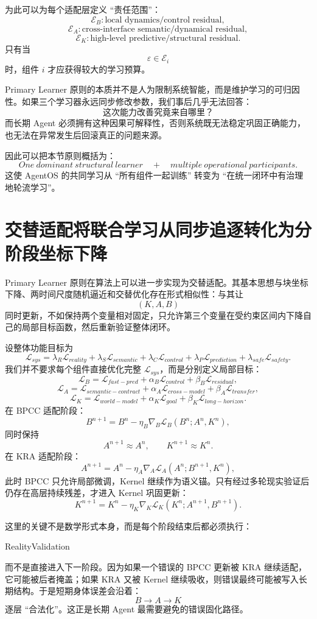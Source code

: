 为此可以为每个适配层定义 ``责任范围''：
\[
\mathcal{E}_B:
\text{local dynamics/control residual},
\]
\[
\mathcal{E}_A:
\text{cross-interface semantic/dynamical residual},
\]
\[
\mathcal{E}_K:
\text{high-level predictive/structural residual}.
\]
只有当
\[
\varepsilon\in\mathcal E_i
\]
时，组件 $i$ 才应获得较大的学习预算。

Primary Learner 原则的本质并不是人为限制系统智能，而是维护学习的可归因性。如果三个学习器永远同步修改参数，我们事后几乎无法回答：
\[
\text{这次能力改善究竟来自哪里？}
\]
而长期 Agent 必须拥有这种因果可解释性，否则系统既无法稳定巩固正确能力，也无法在异常发生后回滚真正的问题来源。

因此可以把本节原则概括为：
\[
\boxed{
One\ dominant\ structural\ learner
\quad
+\quad
multiple\ operational\ participants.
}
\]
这使 AgentOS 的共同学习从 ``所有组件一起训练'' 转变为 ``在统一闭环中有治理地轮流学习''。

\section{交替适配将联合学习从同步追逐转化为分阶段坐标下降}

Primary Learner 原则在算法上可以进一步实现为交替适配。其基本思想与块坐标下降、两时间尺度随机逼近和交替优化存在形式相似性：与其让
\[
(K,A,B)
\]
同时更新，不如保持两个变量相对固定，只允许第三个变量在受约束区间内下降自己的局部目标函数，然后重新验证整体闭环。

设整体功能目标为
\[
\mathcal L_{sys}
=
\lambda_R\mathcal L_{reality}
+
\lambda_S\mathcal L_{semantic}
+
\lambda_C\mathcal L_{control}
+
\lambda_P\mathcal L_{prediction}
+
\lambda_{safe}\mathcal L_{safety}.
\]
我们并不要求每个组件直接优化完整 $\mathcal L_{sys}$，而是分别定义局部目标：
\[
\mathcal L_B
=
\mathcal L_{fast-pred}
+
\alpha_B\mathcal L_{control}
+
\beta_B\mathcal L_{residual},
\]
\[
\mathcal L_A
=
\mathcal L_{semantic-contract}
+
\alpha_A\mathcal L_{cross-model}
+
\beta_A\mathcal L_{transfer},
\]
\[
\mathcal L_K
=
\mathcal L_{world-model}
+
\alpha_K\mathcal L_{goal}
+
\beta_K\mathcal L_{long-horizon}.
\]
在 BPCC 适配阶段：
\[
B^{n+1}
=
B^n
-
\eta_B
\nabla_B
\mathcal L_B
(B^n;A^n,K^n),
\]
同时保持
\[
A^{n+1}\approx A^n,
\qquad
K^{n+1}\approx K^n.
\]
在 KRA 适配阶段：
\[
A^{n+1}
=
A^n
-
\eta_A
\nabla_A
\mathcal L_A
(A^n;B^{n+1},K^n),
\]
此时 BPCC 只允许局部微调，Kernel 继续作为语义锚。只有经过多轮现实验证后仍存在高层持续残差，才进入 Kernel 巩固更新：
\[
K^{n+1}
=
K^n
-
\eta_K
\nabla_K
\mathcal L_K
(K^n;A^{n+1},B^{n+1}).
\]

这里的关键不是数学形式本身，而是每个阶段结束后都必须执行：
\begin{statementbox}
RealityValidation
\end{statementbox}
而不是直接进入下一阶段。因为如果一个错误的 BPCC 更新被 KRA 继续适配，它可能被后者掩盖；如果 KRA 又被 Kernel 继续吸收，则错误最终可能被写入长期结构。于是短期身体误差会沿着：
\[
B\rightarrow A\rightarrow K
\]
逐层 ``合法化''。这正是长期 Agent 最需要避免的错误固化路径。

